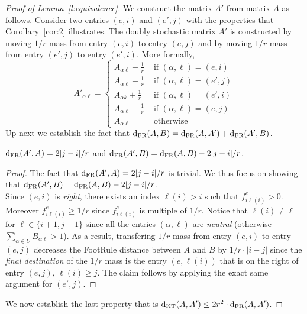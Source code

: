 \begin{proof}[Proof of Lemma~\ref{l:equivalence}]
    We construct the matrix $A'$ from matrix $A$ as follows. Consider two entries $(e,i)$ and $(e',j)$ with the properties that Corollary~\ref{cor:2} illustrates. The doubly stochastic matrix $A'$ is constructed by moving $1/r$ mass from entry $(e,i)$ to entry $(e,j)$ and by moving $1/r$ mass from entry $(e',j)$ to entry $(e',i)$. More formally,
    \begin{equation*}
        A'_{\alpha \ell} = 
        \begin{cases} 
            A_{\alpha \ell} - \frac{1}{r} & \text{ if } (\alpha,\ell)=(e,i) \\
            A_{\alpha \ell} - \frac{1}{r} & \text{ if } (\alpha,\ell)=(e',j)\\
            A_{\alpha k} + \frac{1}{r} & \text{ if } (\alpha,\ell)=(e',i) \\
            A_{\alpha \ell} + \frac{1}{r} & \text{ if } (\alpha,\ell)=(e,j)\\
            A_{\alpha \ell} & \text{ otherwise }
        \end{cases}
    \end{equation*}
\noindent Up next we establish the fact that $\mathrm{d}_{\mathrm{FR}}(A,B) = \mathrm{d}_{\mathrm{FR}}(A,A') + \mathrm{d}_{\mathrm{FR}}(A',B)$.
\begin{claim}
$\mathrm{d}_{\mathrm{FR}}(A',A) = 2|j-i|/r$ and 
$\mathrm{d}_{\mathrm{FR}}(A',B) = \mathrm{d}_{\mathrm{FR}}(A,B) - 2|j-i|/r$.    
\end{claim}
\begin{proof}
The fact that $\mathrm{d}_{\mathrm{FR}}(A',A) = 2|j-i|/r$ is trivial. We thus focus on showing that 
$\mathrm{d}_{\mathrm{FR}}(A',B) = \mathrm{d}_{\mathrm{FR}}(A,B) - 2|j-i|/r$.\\

\noindent Since $(e,i)$ is \textit{right}, there exists an index $\ell(i) >i$ such that $f_{i \ell(i)}^e > 0$. Moreover $f_{i \ell(i)}^e \geq 1/r$ since $f_{i \ell(i)}^e$ is multiple of $1/r$. Notice that $\ell(i) \neq \ell$ for $\ell \in \{i+1,j-1\}$ since all the entries $(\alpha,\ell)$ are \textit{neutral} (otherwise $\sum_{\alpha \in U} B_{\alpha \ell } > 1$). As a result, transfering $1/r$ mass from entry $(e,i)$ to entry $(e,j)$ decreases the FootRule distance between $A$ and $B$ by $1/r\cdot|i-j|$ since the \textit{final destination} of the $1/r$ mass is the entry $(e,\ell(i))$ that is on the right of entry $(e,j)$, $\ell(i) \geq j$. The claim follows by applying the exact same argument for $(e',j)$.    
\end{proof}

\noindent We now establish the last property that is $\mathrm{d}_{\mathrm{KT}}(A,A') \leq 2r^2 \cdot \mathrm{d}_{\mathrm{FR}}(A,A')$.
    

\end{proof}
